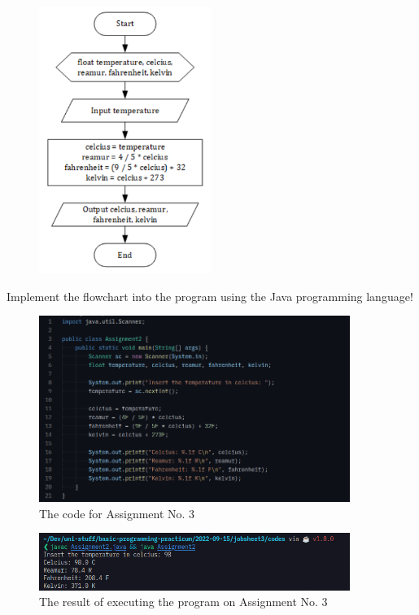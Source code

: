 \documentclass[12pt,titlepage]{article}
\begin{document}
\begin{enumerate}
{        \begin{figure}[h]
            \centering
            \includegraphics[width=0.5\textwidth]{./images/flowchart2.png}
        \end{figure}

        Implement the flowchart into the program using the Java programming language!

        \begin{figure}[h]
            \centering
            \includegraphics[width=0.9\textwidth]{./images/assignment2-code.png}
            \caption{The code for Assignment No. 3}
        \end{figure}
        \begin{figure}[h]
            \centering
            \includegraphics[width=0.9\textwidth]{./images/assignment2-output.png}
            \caption{The result of executing the program on Assignment No. 3}
        \end{figure}
    }
\end{enumerate}
\end{document}
